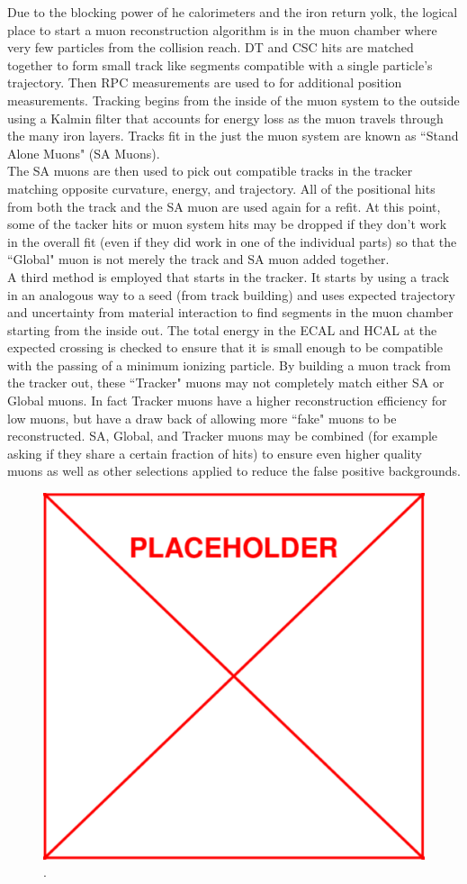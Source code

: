 	Due to the blocking power of he calorimeters and the iron return yolk, the logical place to start a muon reconstruction algorithm is in the muon chamber where very few particles from the collision reach. DT and CSC hits are matched together to form small track like segments compatible with a single particle's trajectory. Then RPC measurements are used to for additional position measurements. Tracking begins from the inside of the muon system to the outside using a Kalmin filter that accounts for energy loss as the muon travels through the many iron layers. Tracks fit in the just the muon system are known as ``Stand Alone Muons" (SA Muons).\\
	
	The SA muons are then used to pick out compatible tracks in the tracker matching opposite curvature, energy, and trajectory. All of the positional hits from both the track and the SA muon are used again for a refit. At this point, some of the tacker hits or muon system hits may be dropped if they don't work in the overall fit (even if they did work in one of the individual parts) so that the ``Global" muon is not merely the track and SA muon added together.\\
	
	A third method is employed that starts in the tracker. It starts by using a track in an analogous way to a seed (from track building) and uses expected trajectory and uncertainty from material interaction to find segments in the muon chamber starting from the inside out. The total energy in the ECAL and HCAL at the expected crossing is checked to ensure that it is small enough to be compatible with the passing of a minimum ionizing particle. By building a muon track from the tracker out, these ``Tracker" muons may not completely match either SA or Global muons. In fact Tracker muons have a higher reconstruction efficiency for low \pt muons, but have a draw back of allowing more ``fake" muons to be reconstructed.  SA, Global, and Tracker muons may be combined (for example asking if they share a certain fraction of hits) to ensure even higher quality muons as well as other selections applied to reduce the false positive backgrounds.\\
	
	
	
			\begin{figure}[h]
\begin{center}
\includegraphics[width=0.48\linewidth]{Figs/placeholder.pdf}
\caption{\label{fig:muon_reconstruction}
.
}
\end{center}
\end{figure}
	
